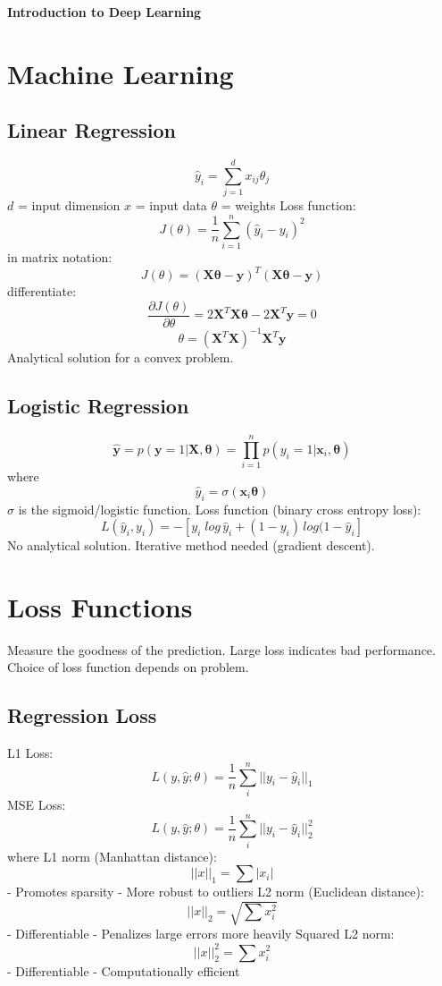 \documentclass{scrartcl}
\begin{document}
\onehalfspacing
\obeylines
\setlength{\parindent}{0pt}
\begin{center}\LARGE\textbf{Introduction to Deep Learning}\end{center}

\section*{Machine Learning}
\subsection*{Linear Regression}
$$\hat{y}_i = \sum_{j=1}^{d} x_{ij} \theta_j$$
$d$ = input dimension
$x$ = input data
$\theta$ = weights
Loss function:
$$J(\theta) = \frac{1}{n} \sum_{i=1}^{n} (\hat{y}_i - y_i)^2$$
in matrix notation:
$$J(\theta) = (\mathbf{X\theta} - \mathbf{y})^T(\mathbf{X\theta} - \mathbf{y})$$
differentiate:
$$\frac{\partial J(\theta)}{\partial \theta} = 2\mathbf{X}^T\mathbf{X\theta} - 2\mathbf{X}^T\mathbf{y} = 0$$
$$\theta = (\mathbf{X}^T\mathbf{X})^{-1}\mathbf{X}^T\mathbf{y}$$
Analytical solution for a convex problem.

\subsection*{Logistic Regression}
$$\mathbf{\hat{y}} = p(\mathbf{y} = 1 | \mathbf{X}, \mathbf{\theta}) = \prod_{i=1}^{n} p(y_i = 1 | \mathbf{x}_i, \mathbf{\theta})$$
where
$$\hat{y}_i = \sigma(\mathbf{x}_i\mathbf{\theta})$$
$\sigma$ is the sigmoid/logistic function.
Loss function (binary cross entropy loss):
$$L(\hat{y}_i, y_i) = -[y_i \; log \, \hat{y}_i + (1 - y_i) \, log(1 - \hat{y}_i]$$
No analytical solution. Iterative method needed (gradient descent).



\section*{Loss Functions}
Measure the goodness of the prediction.
Large loss indicates bad performance.
Choice of loss function depends on problem.

\subsection*{Regression Loss}
L1 Loss:
$$L(y, \hat{y}; \theta) = \frac{1}{n} \sum_{i}^{n} ||y_i - \hat{y}_i ||_1$$
MSE Loss:
$$L(y, \hat{y}; \theta) = \frac{1}{n} \sum_{i}^{n} ||y_i - \hat{y}_i ||_2^2$$
where 
L1 norm (Manhattan distance):
$$||x||_1 = \sum |x_i|$$
- Promotes sparsity
- More robust to outliers
L2 norm (Euclidean distance):
$$||x||_2 = \sqrt{\sum x^2_i}$$
- Differentiable
- Penalizes large errors more heavily
Squared L2 norm:
$$||x||^2_2 = \sum x^2_i$$
- Differentiable
- Computationally efficient
\end{document}
